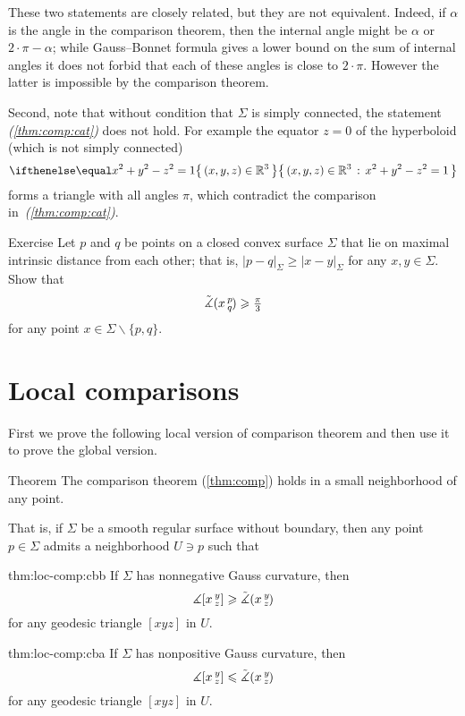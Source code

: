These two statements are closely related, but they are not equivalent.
Indeed, if $\alpha$ is the angle in the comparison theorem, then the internal angle might be $\alpha$ or $2\cdot\pi-\alpha$; while Gauss--Bonnet formula gives a lower bound on the sum of internal angles it does not forbid that each of these angles is close to $2\cdot \pi$.
However the latter is impossible by the comparison theorem.

Second, note that without condition that $\Sigma$ is simply connected, the statement \textit{(\ref{thm:comp:cat})} does not hold.
For example the equator $z=0$ of the hyperboloid (which is not simply connected)
\[\set{(x,y,z)\in\RR^3}{x^2+y^2-z^2=1}\]
forms a triangle with all angles $\pi$, which contradict the comparison in~\textit{(\ref{thm:comp:cat})}.

\begin{thm}{Exercise}\label{ex:diam-angle}
Let $p$ and $q$ be points on a closed convex surface $\Sigma$ that lie on maximal intrinsic distance from each other;
that is, $|p-q|_\Sigma\ge|x-y|_\Sigma$ for any $x,y\in \Sigma$.
Show that 
\[\tilde\measuredangle(x\,{}^{p}_{q}\hspace{-0.2ex})\geqslant \tfrac\pi3\]
for any point $x\in \Sigma\backslash\{p,q\}$.
\end{thm}


\section*{Local comparisons}

First we prove the following local version of comparison theorem and then use it to prove the global version.

\begin{thm}{Theorem}\label{thm:loc-comp}
The comparison theorem (\ref{thm:comp}) holds in a small neighborhood of any point.

That is, if $\Sigma$ be a smooth regular surface without boundary,
then any point $p\in \Sigma$ admits a neighborhood $U\ni p$ such that 

\begin{subthm}{thm:loc-comp:cbb}
If $\Sigma$ has nonnegative Gauss curvature, then 
\[\measuredangle[x\,{}^{y}_{z}]\geqslant\tilde\measuredangle(x\,{}^{y}_{z}\hspace{-0.2ex})\]
for any geodesic triangle $[xyz]$ in $U$.
\end{subthm}

\begin{subthm}{thm:loc-comp:cba}
If $\Sigma$ has nonpositive Gauss curvature, then 
\[\measuredangle[x\,{}^{y}_{z}]\leqslant\tilde\measuredangle(x\,{}^{y}_{z}\hspace{-0.2ex})\]
for any geodesic triangle $[xyz]$ in $U$.
\end{subthm}
\end{thm}

